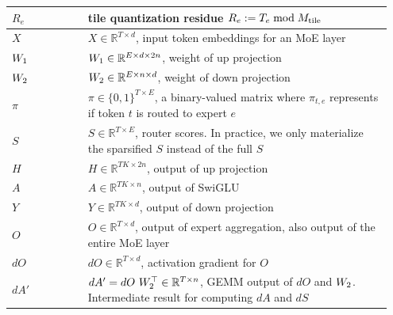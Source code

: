 \begin{table}[!ht]
\begin{center}
\begin{tabular}{p{0.15\linewidth}p{0.0\linewidth}p{0.80\linewidth}}
    $R_e$  &&  tile quantization residue $R_e := T_e \bmod M_\mathrm{tile}$ \\ \midrule



    $X$ &&  $X \in \mathbb{R}^{T \times d}$, input token embeddings for an MoE layer \\ \midrule

  $W_{1}$ &&  $W_{1} \in \mathbb{R}^{E \times d\times 2n}$,  weight of up projection \\ \midrule
  
  $W_{2}$ &&  $W_{2} \in \mathbb{R}^{E \times n\times d}$,   weight of down projection \\ \midrule
  
  $\pi$ &&  $\pi \in \{0, 1\}^{T \times E}$, a binary-valued matrix where $\pi_{t, e}$ represents if token $t$ is routed to expert $e$   \\ \midrule
  
  $S$ &&  $S \in \mathbb{R}^{T \times E}$,  router scores. In practice, we only materialize the sparsified $S$ instead of the full $S$  \\ \midrule
  
  $H$ &&   $H \in \mathbb{R}^{TK\times 2n}$, output of up projection\\ \midrule
  
  $A$ &&   $A \in \mathbb{R}^{TK\times n}$,  output of SwiGLU\\ \midrule
  
  $Y$ &&   $Y \in \mathbb{R}^{TK\times d}$,  output of down projection\\ \midrule

  $O$ &&   $O\in \mathbb{R}^{T\times d}$,  output of expert aggregation, also output of the entire MoE layer\\ \midrule

  $dO$ &&   $dO \in \mathbb{R}^{T\times d}$, activation gradient for $O$ \\ \midrule

  $dA'$ &&   $dA' = dO \ \W{2}^\top \in \mathbb{R}^{T\times n}$,  GEMM output of $dO$ and $W_{2}$. Intermediate result for computing $dA$ and $dS$\\ \midrule


\end{tabular}
\end{center}
\end{table}
